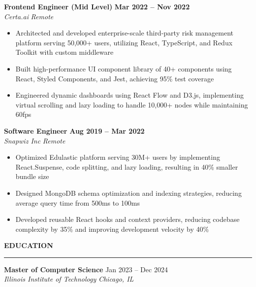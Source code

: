 \documentclass[10pt,letterpaper]{article}
\begin{document}
\vspace{1mm}
\hspace{0in}\textbf{Frontend Engineer (Mid Level)} \hfill \textbf{Mar 2022 -- Nov 2022}\\
\hspace{0in}\textit{Certa.ai} \hfill \textit{Remote}
\begin{itemize}[leftmargin=0.15in,nosep,topsep=3pt]
    \item Architected and developed enterprise-scale third-party risk management platform serving 50,000+ users, utilizing React, TypeScript, and Redux Toolkit with custom middleware
    \item Built high-performance UI component library of 40+ components using React, Styled Components, and Jest, achieving 95\% test coverage
    \item Engineered dynamic dashboards using React Flow and D3.js, implementing virtual scrolling and lazy loading to handle 10,000+ nodes while maintaining 60fps
\end{itemize}

\vspace{1mm}
\hspace{0in}\textbf{Software Engineer} \hfill \textbf{Aug 2019 -- Mar 2022}\\
\hspace{0in}\textit{Snapwiz Inc} \hfill \textit{Remote}
\begin{itemize}[leftmargin=0.15in,nosep,topsep=3pt]
    \item Optimized Edulastic platform serving 30M+ users by implementing React.Suspense, code splitting, and lazy loading, resulting in 40\% smaller bundle size
    \item Designed MongoDB schema optimization and indexing strategies, reducing average query time from 500ms to 100ms
    \item Developed reusable React hooks and context providers, reducing codebase complexity by 35\% and improving development velocity by 40\%
\end{itemize}

\vspace{2mm}
{\hspace{0in}\small\textbf{EDUCATION}}\par
\vspace{-2mm}
\noindent\rule{\textwidth}{0.1pt}
\vspace{-4mm}

\hspace{0in}\textbf{Master of Computer Science} \hfill Jan 2023 -- Dec 2024 \\
\hspace{0.25in}\textit{Illinois Institute of Technology} \hfill \textit{Chicago, IL}
\end{document}
